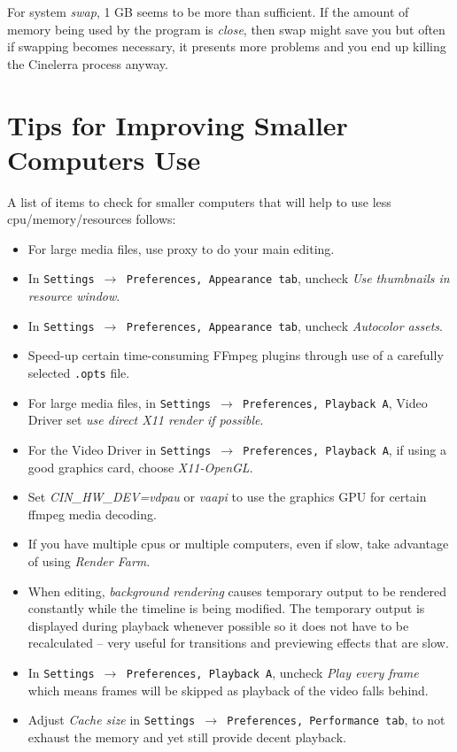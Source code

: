 For system \textit{swap}, 1 GB seems to be more than sufficient.  If the amount of memory being used by the program is \textit{close}, then swap might save you but often if swapping becomes necessary, it presents more problems and you end up killing the Cinelerra process anyway.

\section{Tips for Improving Smaller Computers Use}%
\label{sec:tips_improving_smaller_computers}

A list of items to check for smaller computers that will help to use less cpu/memory/resources follows:

\begin{itemize}
	\item For large media files, use proxy to do your main editing.
	\item In \texttt{Settings $\rightarrow$ Preferences, Appearance tab}, uncheck \textit{Use thumbnails in resource window}.
	\item In \texttt{Settings $\rightarrow$ Preferences, Appearance tab}, uncheck \textit{Autocolor assets}.
	\item  Speed-up certain time-consuming FFmpeg plugins through use of a carefully selected \texttt{.opts} file.
	\item For large media files, in \texttt{Settings $\rightarrow$ Preferences, Playback A}, Video Driver set \textit{use direct X11 render if possible}.
	\item For the Video Driver in \texttt{Settings $\rightarrow$ Preferences, Playback A}, if using a good graphics card, choose \textit{X11-OpenGL}.
	\item Set \textit{CIN\_HW\_DEV=vdpau} or \textit{vaapi} to use the graphics GPU for certain ffmpeg media decoding.
	\item If you have multiple cpus or multiple computers, even if slow, take advantage of using \textit{Render Farm}.
	\item When editing, \textit{background rendering} causes temporary output to be rendered constantly while the
	timeline is being modified. The temporary output is displayed during playback whenever possible so 
	it does not have to be recalculated -- very useful for transitions and previewing effects that are slow.
	\item In  \texttt{Settings $\rightarrow$ Preferences, Playback A}, uncheck \textit{Play every frame} which means frames will be skipped as playback of the video falls behind.
	\item Adjust \textit{Cache size} in \texttt{Settings $\rightarrow$ Preferences, Performance tab}, to not exhaust the memory and yet still provide decent playback.
\end{itemize}

